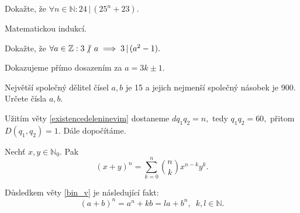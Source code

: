 \begin{priklad}
Dokažte, že  $\forall n \in \mathbb N: 24 \, | \, (25^n+23).$
\end{priklad}

\begin{reseni}
Matematickou indukcí.
\end{reseni}

\begin{priklad}
Dokažte, že $\forall a \in \mathbb Z: 3 \, \centernot | \, a \implies 3 \, | \, (a^2-1).$
\end{priklad}

\begin{reseni}
Dokazujeme přímo dosazením za $a=3k\pm 1.$
\end{reseni}

\begin{priklad}
Největší společný dělitel čísel $a,b$ je 15 a jejich nejmenší společný násobek je 900.
Určete čísla $a,b$.
\end{priklad}

\begin{reseni}
Užitím věty \ref{existencedeleninevim} dostaneme $dq_1q_2=n,$ tedy $q_1q_2=60,$ přitom
$D(q_1,q_2)=1.$ Dále dopočítáme.
\end{reseni}

\begin{veta}\label{bin_v}
  Nechť $x,y \in \mathbb N_0$. Pak
  $$(x+y)^n=\sum_{k=0}^n \binom{n}{k}x^{n-k}y^k.$$
\end{veta}

\begin{dusledek}
  Důsledkem věty \ref{bin_v} je následující fakt:
  \[
    (a+b)^n=a^n+kb=la+b^n,\,\,\, k,l\in \mathbb N.
  \]
\end{dusledek}

